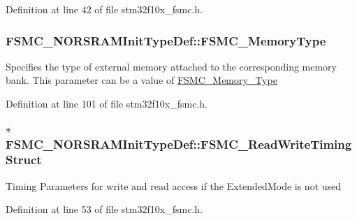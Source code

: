 Definition at line 42 of file stm32f10x\+\_\+fsmc.\+h.

\subsubsection[{\texorpdfstring{F\+S\+M\+C\+\_\+\+Memory\+Type}{FSMC_MemoryType}}]{ F\+S\+M\+C\+\_\+\+N\+O\+R\+S\+R\+A\+M\+Init\+Type\+Def\+::\+F\+S\+M\+C\+\_\+\+Memory\+Type}\hypertarget{struct_f_s_m_c___n_o_r_s_r_a_m_init_type_def_a979ad605c6a63923e060576ee01e888d}{}\label{struct_f_s_m_c___n_o_r_s_r_a_m_init_type_def_a979ad605c6a63923e060576ee01e888d}
Specifies the type of external memory attached to the corresponding memory bank. This parameter can be a value of \hyperlink{group___f_s_m_c___memory___type}{F\+S\+M\+C\+\_\+\+Memory\+\_\+\+Type} 

Definition at line 101 of file stm32f10x\+\_\+fsmc.\+h.

\subsubsection[{\texorpdfstring{F\+S\+M\+C\+\_\+\+Read\+Write\+Timing\+Struct}{FSMC_ReadWriteTimingStruct}}]{ $\ast$ F\+S\+M\+C\+\_\+\+N\+O\+R\+S\+R\+A\+M\+Init\+Type\+Def\+::\+F\+S\+M\+C\+\_\+\+Read\+Write\+Timing\+Struct}\hypertarget{struct_f_s_m_c___n_o_r_s_r_a_m_init_type_def_a89727833f179b72ede3f11396c01732c}{}\label{struct_f_s_m_c___n_o_r_s_r_a_m_init_type_def_a89727833f179b72ede3f11396c01732c}
Timing Parameters for write and read access if the Extended\+Mode is not used 

Definition at line 53 of file stm32f10x\+\_\+fsmc.\+h.

